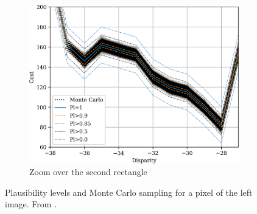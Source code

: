 \begin{figure}
\begin{subfigure}{0.45\linewidth}
        \includegraphics[width=\linewidth]{Images/Chap_4/cost_curve_100_120_zoom2.png}
        \caption{Zoom over the second rectangle}
        \label{fig:montecarlo_gauss_100_120_zoom2}
    \end{subfigure}
    \caption{Plausibility levels and Monte Carlo sampling for a pixel of the left image. From \cite{malinowski_uncertainty_2024}.}
    \label{fig:montecarlo_gauss_100_120}
\end{figure}

